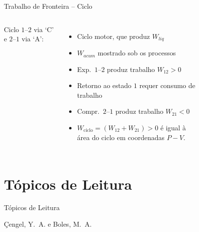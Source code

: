     \begin{frame}{Trabalho de Fronteira -- Ciclo}\vspace*{-2em}
        \begin{columns}
        Ciclo $1$--$2$ via `C' e $2$--$1$ via `A':
        \begin{itemize}
            \item<1> Ciclo \alert{motor}, que \alert{produz} $W_{liq}$
            \item<1> $W_{acum}$ mostrado sob os processos
            \item<1> Exp.~$1$--$2$ \alert{produz} trabalho $W_{12} > 0$
            \item<1> Retorno ao estado $1$ requer \alert{consumo} de trabalho
            \item<1> Compr.~$2$--$1$ \alert{produz} trabalho $W_{21} < 0$
            \item<1> $W_{\mathrm{ciclo}} = (W_{12} + W_{21}) > 0$ é igual à \alert{área do
                ciclo} em \alert{coordenadas $P-V$}.
        \end{itemize}
            \begin{figure}
            \end{figure}
        \end{columns}
    \end{frame}

\section{Tópicos de Leitura}

    \begin{frame}[allowframebreaks]{Tópicos de Leitura}
        \begin{thebibliography}{Çengel, Y.~A., 2013}
                Çengel, Y.~A. e Boles, M.~A.
        \end{thebibliography}
    \end{frame}





